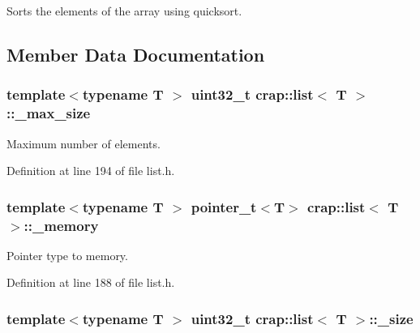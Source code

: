 Sorts the elements of the array using quicksort. 



\subsection{Member Data Documentation}
\hypertarget{classcrap_1_1list_ae71931f777bfb9dd77a8a4acfd0eb84c}{
\subsubsection[{\+\_\+max\+\_\+size}]{\setlength{\rightskip}{0pt plus 5cm}template$<$typename T $>$ uint32\+\_\+t {\bf crap\+::list}$<$ T $>$\+::\+\_\+max\+\_\+size\hspace{0.3cm}{\ttfamily [protected]}}}\label{classcrap_1_1list_ae71931f777bfb9dd77a8a4acfd0eb84c}


Maximum number of elements. 



Definition at line 194 of file list.\+h.

\hypertarget{classcrap_1_1list_a91e68cdffc589e85501a76100cf02b74}{
\subsubsection[{\+\_\+memory}]{\setlength{\rightskip}{0pt plus 5cm}template$<$typename T $>$ {\bf pointer\+\_\+t}$<$T$>$ {\bf crap\+::list}$<$ T $>$\+::\+\_\+memory\hspace{0.3cm}{\ttfamily [protected]}}}\label{classcrap_1_1list_a91e68cdffc589e85501a76100cf02b74}


Pointer type to memory. 



Definition at line 188 of file list.\+h.

\hypertarget{classcrap_1_1list_a8c38722c28fc087444acc484f7b0aa38}{
\subsubsection[{\+\_\+size}]{\setlength{\rightskip}{0pt plus 5cm}template$<$typename T $>$ uint32\+\_\+t {\bf crap\+::list}$<$ T $>$\+::\+\_\+size\hspace{0.3cm}{\ttfamily [protected]}}}\label{classcrap_1_1list_a8c38722c28fc087444acc484f7b0aa38}


